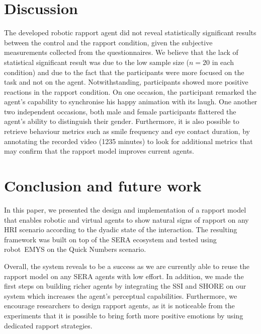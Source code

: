 \section{Discussion}

The developed robotic rapport agent did not reveal statistically significant results between the control and the rapport condition, given the subjective measurements collected from the questionnaires. We believe that the lack of statistical significant result was due to the low sample size ($n=20$ in each condition) and due to the fact that the participants were more focused on the task and not on the agent. Notwithstanding, participants showed more positive reactions in the rapport condition. On one occasion, the participant remarked the agent's capability to synchronise his happy animation with its laugh. One another two independent occasions, both male and female participants flattered the agent's ability to distinguish their gender. Furthermore, it is also possible to retrieve behaviour metrics such as smile frequency and eye contact duration, by annotating the recorded video (1235 minutes) to look for additional metrics that may confirm that the rapport model improves current agents.

\section{Conclusion and future work}

In this paper, we presented the design and implementation of a rapport model that enables robotic and virtual agents to show natural signs of rapport on any \ac{HRI} scenario according to the dyadic state of the interaction. The resulting framework was built on top of the \ac{SERA} ecosystem and tested using robot~\ac{EMYS} on the Quick Numbers scenario.

Overall, the system reveals to be a success as we are currently able to reuse the rapport model on any \ac{SERA} agents with low effort. In addition, we made the first steps on building richer agents by integrating the \ac{SSI} and SHORE on our system which increases the agent's perceptual capabilities. Furthermore, we encourage researchers to design rapport agents, as it is noticeable from the experiments that it is possible to bring forth more positive emotions by using dedicated rapport strategies.

